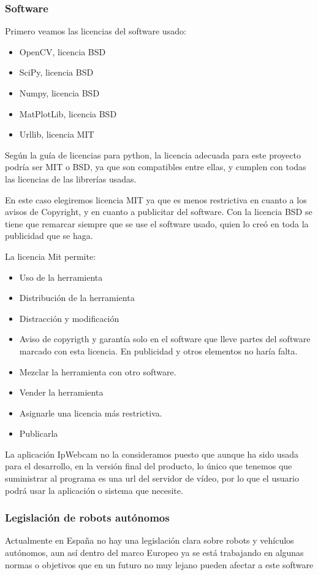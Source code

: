 \subsubsection{Software}
Primero veamos las licencias del software usado:
\begin{itemize}
	\item OpenCV, licencia BSD
	\item SciPy, licencia BSD
 	\item Numpy, licencia BSD
	\item MatPlotLib, licencia BSD
	\item Urllib, licencia MIT
\end{itemize}
Según la guía de licencias para python\cite{licen}, la licencia adecuada para este proyecto podría ser MIT o BSD, ya que son compatibles entre ellas, y cumplen con todas las licencias de las librerías usadas.

En este caso elegiremos licencia MIT ya que es menos restrictiva en cuanto a los avisos de Copyright, y en cuanto a publicitar del software. Con la licencia BSD se tiene que remarcar siempre que se use el software usado, quien lo creó en toda la publicidad que se haga.

La licencia Mit permite\cite{mit}:
\begin{itemize}
	\item Uso de la herramienta
	\item Distribución de la herramienta
	\item Distracción y modificación
	\item Aviso de copyrigth y garantía solo en el software que lleve partes del software marcado con esta licencia. En publicidad y otros elementos no haría falta.
	\item Mezclar la herramienta con otro software.
	\item Vender la herramienta
	\item Asignarle una licencia más restrictiva.
	\item Publicarla
\end{itemize}

La aplicación IpWebcam no la consideramos puesto que aunque ha sido usada para el desarrollo, en la versión final del producto, lo único que tenemos que suministrar al programa es una url del servidor de vídeo, por lo que el usuario podrá usar la aplicación o sistema que necesite.

\subsubsection{Legislación de robots autónomos}
Actualmente en España no hay una legislación clara sobre robots y vehículos autónomos, aun así dentro del marco Europeo ya se está trabajando en algunas normas o objetivos que en un futuro no muy lejano pueden afectar a este software\cite{ley_rob}

